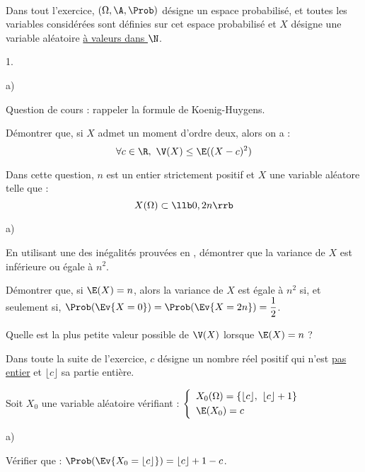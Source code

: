 \documentclass[11pt]{article}%
\begin{document}
\begin{exerciceAP}~\\
  Dans tout l'exercice, $(\Omega, \A, \Prob)$ désigne un espace
  probabilisé, et toutes les variables considérées sont définies sur
  cet espace probabilisé et $X$ désigne une variable aléatoire
  \underline{à valeurs dans $\N$}.
  \begin{noliste}{1.}
    \setlength{\itemsep}{2mm}
  \item
    \begin{noliste}{a)}
      \setlength{\itemsep}{2mm}
    \item Question de cours : rappeler la formule de Koenig-Huygens.
      
    \item Démontrer que, si $X$ admet un moment d'ordre deux, alors on
      a :
      \[
      \forall c \in \R, \ \V(X) \leq \E((X-c)^2)
      \]
    \end{noliste}
    
  \item Dans cette question, $n$ est un entier strictement positif et
    $X$ une variable aléatore telle que :
    \[
    X(\Omega) \subset \llb 0, 2n \rrb
    \]
    \begin{noliste}{a)}
      \setlength{\itemsep}{2mm}
    \item En utilisant une des inégalités prouvées en , 
      démontrer que la variance de $X$ est inférieure ou égale à $n^2$.
      
    \item Démontrer que, si $\E(X) = n$, alors la variance de $X$ est
      égale à $n^2$ si, et seulement si, $\Prob(\Ev{X=0}) =
      \Prob(\Ev{X=2n}) = \dfrac{1}{2}$.
    
    \item Quelle est la plus petite valeur possible de $\V(X)$ lorsque
      $\E(X) = n$ ?
    \end{noliste}
  
  \noindent
  Dans toute la suite de l'exercice, $c$ désigne un nombre réel positif
  qui n'est \underline{pas entier} et $\lfloor c \rfloor$ sa partie 
  entière.
    \item Soit $X_0$ une variable aléatoire vérifiant : $\left\{
    \begin{array}{l}
      X_0(\Omega) = \{ \lfloor c \rfloor, \ \lfloor c \rfloor 
      +1\}\\[.1cm]
      \E(X_0) = c
    \end{array}
    \right.$
    \begin{noliste}{a)}
    \setlength{\itemsep}{2mm}
      \item Vérifier que : $\Prob(\Ev{X_0 = \lfloor c \rfloor }) =
      \lfloor c \rfloor +1-c$.
      

\end{noliste}
\end{noliste}
\end{exerciceAP}
\end{document}
